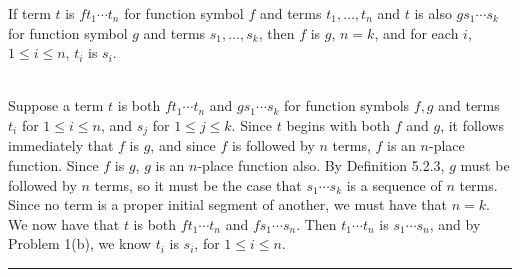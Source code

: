 \documentclass[11pt]{hmcpset}
\newenvironment{problem2}[1]{\noindent {\bf (#1}}
{\medskip}
\newenvironment{proof}{\noindent {\bf Proof:} \\}{\hfill
\rule{1mm}{3mm} \bigskip}
\begin{document}
\begin{problem2}{c)} If term $t$ is $ft_1\cdots t_n$ for function symbol $f$ and terms $t_1,\dots ,t_n$ and $t$ is also $gs_1\cdots s_k$ for function symbol $g$ and terms $s_1,\ldots ,s_k$, then $f$ is $g$, $n=k$, and for each $i$, $1\le i\le n$, $t_i$ is $s_i$.

\begin{proof}\indent Suppose a term $t$ is both $ft_1\cdots t_n$ and $gs_1\cdots s_k$ for function symbols $f,g$ and terms $t_i$ for $1\le i\le n$, and $s_j$ for $1\le j \le k$. Since $t$ begins with both $f$ and $g$, it follows immediately that $f$ is $g$, and since $f$ is followed by $n$ terms, $f$ is an $n$-place function. Since $f$ is $g$, $g$ is an $n$-place function also. By Definition 5.2.3, $g$ must be followed by $n$ terms, so it must be the case that $s_1\cdots s_k$ is a sequence of $n$ terms. Since no term is a proper initial segment of another, we must have that $n=k$. We now have that $t$ is both $ft_1\cdots t_n$ and $fs_1\cdots s_n$. Then $t_1\cdots t_n$ is $s_1\cdots s_n$, and by Problem 1(b), we know $t_i$ is $s_i$, for $1\le i\le n$.
\end{proof}
\end{problem2}
\end{document}
